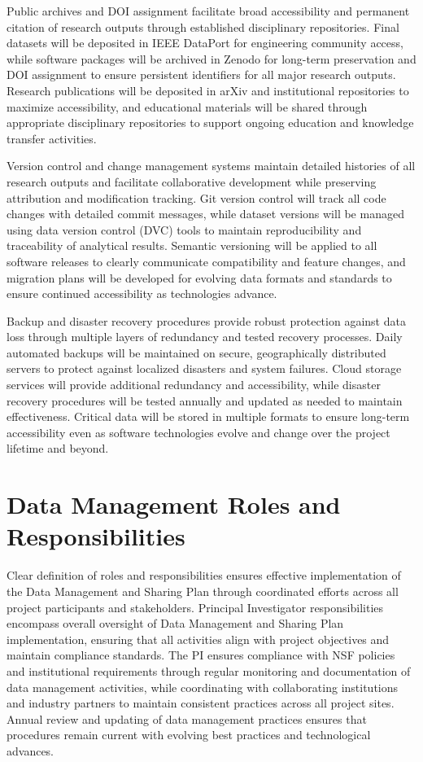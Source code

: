 \documentclass[12pt]{article}
\begin{document}
Public archives and DOI assignment facilitate broad accessibility and permanent citation of research outputs through established disciplinary repositories. Final datasets will be deposited in IEEE DataPort for engineering community access, while software packages will be archived in Zenodo for long-term preservation and DOI assignment to ensure persistent identifiers for all major research outputs. Research publications will be deposited in arXiv and institutional repositories to maximize accessibility, and educational materials will be shared through appropriate disciplinary repositories to support ongoing education and knowledge transfer activities.

Version control and change management systems maintain detailed histories of all research outputs and facilitate collaborative development while preserving attribution and modification tracking. Git version control will track all code changes with detailed commit messages, while dataset versions will be managed using data version control (DVC) tools to maintain reproducibility and traceability of analytical results. Semantic versioning will be applied to all software releases to clearly communicate compatibility and feature changes, and migration plans will be developed for evolving data formats and standards to ensure continued accessibility as technologies advance.

Backup and disaster recovery procedures provide robust protection against data loss through multiple layers of redundancy and tested recovery processes. Daily automated backups will be maintained on secure, geographically distributed servers to protect against localized disasters and system failures. Cloud storage services will provide additional redundancy and accessibility, while disaster recovery procedures will be tested annually and updated as needed to maintain effectiveness. Critical data will be stored in multiple formats to ensure long-term accessibility even as software technologies evolve and change over the project lifetime and beyond.


\section{Data Management Roles and Responsibilities}

Clear definition of roles and responsibilities ensures effective implementation of the Data Management and Sharing Plan through coordinated efforts across all project participants and stakeholders. Principal Investigator responsibilities encompass overall oversight of Data Management and Sharing Plan implementation, ensuring that all activities align with project objectives and maintain compliance standards. The PI ensures compliance with NSF policies and institutional requirements through regular monitoring and documentation of data management activities, while coordinating with collaborating institutions and industry partners to maintain consistent practices across all project sites. Annual review and updating of data management practices ensures that procedures remain current with evolving best practices and technological advances.
\end{document}
